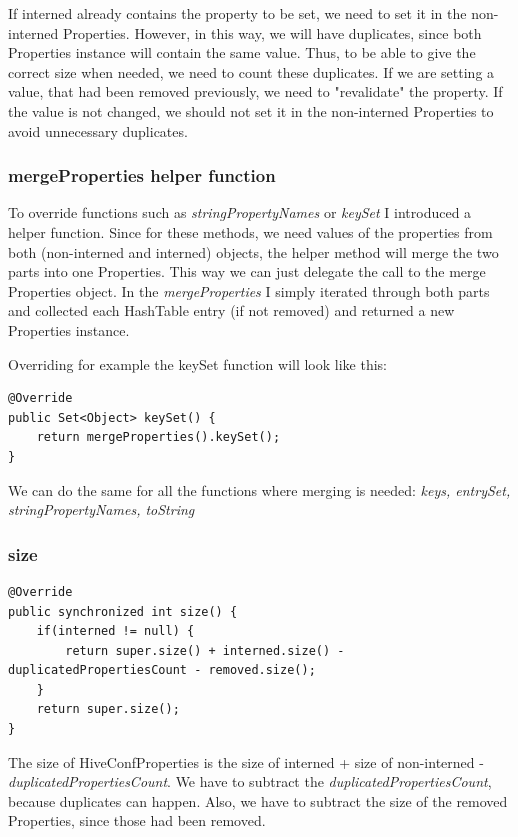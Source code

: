 If interned already contains the property to be set, we need to set it in the non-interned Properties. However, in this way, we will have duplicates, since both Properties instance will contain the same value. Thus, to be able to give the correct size when needed, we need to count these duplicates. If we are setting a value, that had been removed previously, we need to "revalidate" the property. If the value is not changed, we should not set it in the non-interned Properties to avoid unnecessary duplicates. 

\subsubsection{mergeProperties helper function}
To override functions such as \textit{stringPropertyNames} or \textit{keySet} \etc I introduced a helper function. Since for these methods, we need values of the properties from both (non-interned and interned) objects, the helper method will merge the two parts into one Properties. This way we can just delegate the call to the merge Properties object. In the \textit{mergeProperties} I simply iterated through both parts and collected each HashTable entry (if not removed) and returned a new Properties instance. 

\noindent Overriding for example the keySet function will look like this:
\begin{lstlisting}
@Override
public Set<Object> keySet() {
	return mergeProperties().keySet();
}
\end{lstlisting}

We can do the same for all the functions where merging is needed: \textit{keys, entrySet, stringPropertyNames, toString \etc}

\subsubsection{size}
\begin{lstlisting}
@Override
public synchronized int size() {
	if(interned != null) {
		return super.size() + interned.size() - duplicatedPropertiesCount - removed.size();
	}
	return super.size();
}
\end{lstlisting}
The size of HiveConfProperties is the size of interned + size of non-interned - \textit{duplicatedPropertiesCount}. We have to subtract the \textit{duplicatedPropertiesCount}, because duplicates can happen. Also, we have to subtract the size of the removed Properties, since those had been removed.

